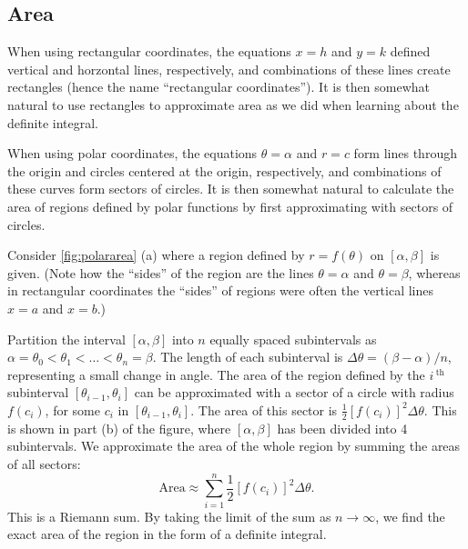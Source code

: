 \subsection*{Area}

When using rectangular coordinates, the equations $x=h$ and $y=k$ defined vertical and horzontal lines, respectively, and combinations of these lines create rectangles (hence the name ``rectangular coordinates''). It is then somewhat natural to use rectangles to approximate area as we did when learning about the definite integral.

When using polar coordinates, the equations $\theta=\alpha$ and $r=c$ form lines through the origin and circles centered at the origin, respectively, and combinations of these curves form sectors of circles. It is then somewhat natural to calculate the area of regions defined by polar functions by first approximating with sectors of circles. 

Consider \autoref{fig:polararea} (a) where a region defined by $r=f(\theta)$ on $[\alpha,\beta]$ is given. (Note how the ``sides'' of the region are the lines $\theta=\alpha$ and $\theta=\beta$, whereas in rectangular coordinates the ``sides'' of regions were often the vertical lines $x=a$ and $x=b$.)


Partition the interval $[\alpha,\beta]$ into $n$ equally spaced subintervals as $\alpha=\theta_0<\theta_1<\dotso<\theta_n=\beta$. The length of each subinterval is $\Delta\theta = (\beta-\alpha)/n$, representing a small change in angle. The area of the region defined by the $i\,^\text{th}$ subinterval $[\theta_{i-1},\theta_i]$ can be approximated with a sector of a circle with radius $f(c_i)$, for some $c_i$ in $[\theta_{i-1},\theta_i]$. The area of this sector is $\frac12[f(c_i)]^2\Delta\theta$. This is shown in part (b) of the figure, where $[\alpha,\beta]$ has been divided into 4 subintervals. We approximate the area of the whole region by summing the areas of all sectors:
$$\text{Area} \approx \sum_{i=1}^n \frac12[f(c_i)]^2\Delta\theta.$$
This is a Riemann sum. By taking the limit of the sum as $n\to\infty$, we find the exact area of the region in the form of a definite integral.


